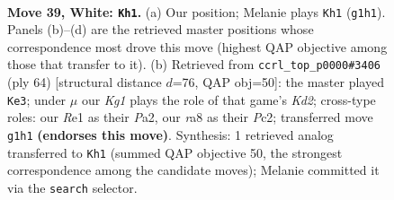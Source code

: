 \documentclass[11pt]{article}
\begin{document}
\clearpage

\begin{figure}[p]\centering
\begin{subfigure}{0.46\textwidth}\centering
\resizebox{\linewidth}{!}{%
\newchessgame
\chessboard[
  setfen={r6k/bp1b4/p3p1rp/8/8/BP1p3q/PR3P1P/4R1K1 w - - 0 39},
  showmover=false,
  pgfstyle=straightmove, color=movearrow, markmove={g1-h1}
]}
\caption{}
\end{subfigure}\hfill
\begin{subfigure}{0.46\textwidth}\centering
\resizebox{\linewidth}{!}{%
\newchessgame
\chessboard[
  setfen={8/p1r1ppk1/7p/RBpr1b2/7P/1PR2P2/P1PK4/8 w - - 3 33},
  showmover=false,
  pgfstyle=straightmove, color=movearrow, markmove={d2-e3}
]}
\caption{}
\end{subfigure}
\\[4pt]

\caption{\textbf{Move 39, White: \texttt{Kh1}.} (a) Our position; Melanie plays \texttt{Kh1} (\texttt{g1h1}). Panels (b)--(d) are the retrieved master positions whose correspondence most drove this move (highest QAP objective among those that transfer to it). (b) Retrieved from \texttt{ccrl\_top\_p0000\#3406} (ply 64) [structural distance $d$=76, QAP obj=50]: the master played \texttt{Ke3}; under $\mu$ our \emph{Kg1} plays the role of that game's \emph{Kd2}; cross-type roles: our \emph{R}e1 as their \emph{P}a2, our \emph{r}a8 as their \emph{P}c2; transferred move \texttt{g1h1} \textbf{(endorses this move)}. Synthesis: 1 retrieved analog transferred to \texttt{Kh1} (summed QAP objective 50, the strongest correspondence among the candidate moves); Melanie committed it via the \texttt{search} selector.}
\label{fig:thought-m76}
\end{figure}
\end{document}

